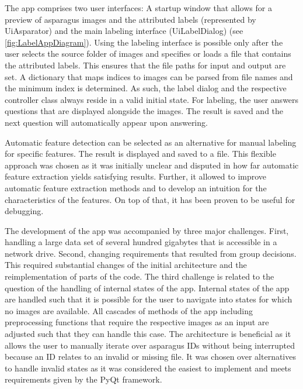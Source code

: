The app comprises two user interfaces: A startup window that allows for a preview of asparagus images and the attributed labels (represented by Ui\textunderscore Asparator) and the main labeling interface (Ui\textunderscore LabelDialog) (see \autoref{fig:LabelAppDiagram}). Using the labeling interface is possible only after the user selects the source folder of images and specifies or loads a file that contains the attributed labels. This ensures that the file paths for input and output are set. A dictionary that maps indices to images can be parsed from file names and the minimum index is determined. As such, the label dialog and the respective controller class always reside in a valid initial state. For labeling, the user answers questions that are displayed alongside the images. The result is saved and the next question will automatically appear upon answering.

Automatic feature detection can be selected as an alternative for manual labeling for specific features. The result is displayed and saved to a file. This flexible approach was chosen as it was initially unclear and disputed in how far automatic feature extraction yields satisfying results. Further, it allowed to improve automatic feature extraction methods and to develop an intuition for the characteristics of the features. On top of that, it has been proven to be useful for debugging.

\bigskip
The development of the app was accompanied by three major challenges. First, handling a large data set of several hundred gigabytes that is accessible in a network drive. Second, changing requirements that resulted from group decisions. This required substantial changes of the initial architecture and the reimplementation of parts of the code. The third challenge is related to the question of the handling of internal states of the app. 
Internal states of the app are handled such that it is possible for the user to navigate into states for which no images are available. All cascades of methods of the app including preprocessing functions that require the respective images as an input are adjusted such that they can handle this case. The architecture is beneficial as it allows the user to manually iterate over asparagus IDs without being interrupted because an ID relates to an invalid or missing file. It was chosen over alternatives to handle invalid states as it was considered the easiest to implement and meets requirements given by the PyQt framework.

